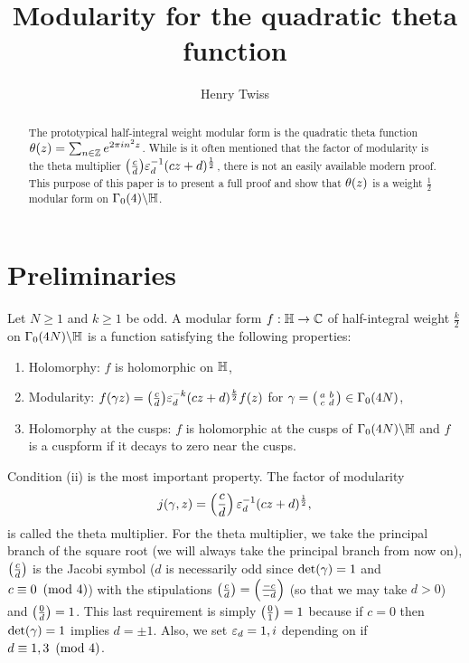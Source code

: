 \documentclass[12pt,reqno,oneside]{amsart}
\title{Modularity for the quadratic theta function}
\author{Henry Twiss}
\begin{document}
\begin{abstract}
    The prototypical half-integral weight modular form is the quadratic theta function $\theta(z) = \sum_{n \in \mathbb{Z}}e^{2\pi in^{2}z}$. While is it often mentioned that the factor of modularity is the theta multiplier $\textstyle{\left(\frac{c}{d}\right)}\varepsilon_{d}^{-1}(cz+d)^{\frac{1}{2}}$, there is not an easily available modern proof. This purpose of this paper is to present a full proof and show that $\theta(z)$ is a weight $\frac{1}{2}$ modular form on $\Gamma_{0}(4)\backslash\mathbb{H}$.
\end{abstract}

\maketitle

\section{Preliminaries}
    Let $N \ge 1$ and $k \ge 1$ be odd. A modular form $f:\mathbb{H} \to \mathbb{C}$ of half-integral weight $\frac{k}{2}$ on $\Gamma_{0}(4N)\backslash\mathbb{H}$ is a function satisfying the following properties:
    \begin{enumerate}[label=(\roman*)]
        \item Holomorphy: $f$ is holomorphic on $\mathbb{H}$,
        \item Modularity: $f(\gamma z) = \textstyle{\left(\frac{c}{d}\right)}\varepsilon_{d}^{-k}(cz+d)^{\frac{k}{2}}f(z)$ for $\gamma = \begin{psmallmatrix} a & b \\ c & d \end{psmallmatrix} \in \Gamma_{0}(4N)$,
        \item Holomorphy at the cusps: $f$ is holomorphic at the cusps of $\Gamma_{0}(4N)\backslash\mathbb{H}$ and $f$ is a cuspform if it decays to zero near the cusps.
    \end{enumerate}
    Condition (ii) is the most important property. The factor of modularity
    \[
        j(\gamma,z) = \left(\frac{c}{d}\right)\varepsilon_{d}^{-1}(cz+d)^{\frac{1}{2}},
    \]
    is called the theta multiplier. For the theta multiplier, we take the principal branch of the square root (we will always take the principal branch from now on), $\left(\frac{c}{d}\right)$ is the Jacobi symbol ($d$ is necessarily odd since $\det(\gamma) = 1$ and $c \equiv 0 \ \left(\text{mod }4\right)$) with the stipulations $\left(\frac{c}{d}\right) = \left(\frac{-c}{-d}\right)$ (so that we may take $d > 0$) and $\left(\frac{0}{d}\right) = 1$. This last requirement is simply $\left(\frac{0}{1}\right) = 1$ because if $c = 0$ then $\det(\gamma) = 1$ implies $d = \pm 1$. Also, we set $\varepsilon_{d} = 1,i$ depending on if $d \equiv 1,3 \ \left(\text{mod }4\right)$.
    
\end{document}
